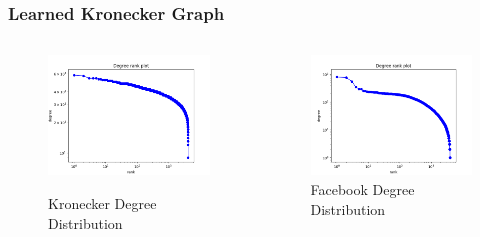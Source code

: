 \documentclass{beamer}
\begin{document}
\begin{frame}
\frametitle{Learned Kronecker Graph}
\begin{columns}[onlytextwidth]
\begin{column}{.45\textwidth}
\begin{figure}
  \includegraphics[width=\textwidth,height=\textheight,keepaspectratio]{kronecker_degree_distribution}\\
  \caption{Kronecker Degree Distribution}
\end{figure}
\end{column}
\hfill
\begin{column}{.45\textwidth}
\begin{figure}
\includegraphics[width=\textwidth,height=\textheight,keepaspectratio]{facebook_degree_distribution}
  \caption{Facebook Degree Distribution}
\end{figure}
\end{column}
\end{columns}
\end{frame}
\end{document}

